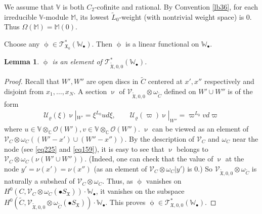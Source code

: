 \documentclass[12pt,b5paper,notitlepage]{report}
\theoremstyle{definition}
\theoremstyle{plain}
\newtheorem{lm}[df]{Lemma}
\newcommand{\fk}{\mathfrak}
\newcommand{\mc}{\mathcal}
\newcommand{\wtd}{\widetilde}
\newcommand{\scr}{\mathscr}
\newcommand{\SX}{S_{\fk X}}
\newcommand{\blt}{\bullet}
\newcommand{\Vbb}{\mathbb V}
\newcommand{\Wbb}{\mathbb W}
\newcommand{\Mbb}{\mathbb M}
\newcommand{\Cbb}{\mathbb C}
\numberwithin{equation}{section}
\begin{document}
We assume  that $\Vbb$ is both $C_2$-cofinite and rational. By Convention \ref{lb36}, for each irreducible $\Vbb$-module $\Mbb$,  its lowest $\wtd L_0$-weight (with nontrivial weight space) is $0$. Thus $\Omega(\Mbb)=\Mbb(0)$.

Choose any $\upphi\in\scr T_{\fk X_0}^*(\Wbb_\blt)$. Then $\upphi$ is a linear functional on $\Wbb_\blt$.


\begin{lm}
$\upphi$ is an element of $\scr T_{\wtd{\fk X},0,0}^*(\Wbb_\blt)$.
\end{lm}



\begin{proof}
Recall that $W',W''$ are open discs in $\wtd C$ centered at $x',x''$  respectively and disjoint from $x_1,\dots,x_N$. A section $\upnu$ of $\scr V_{\wtd{\fk X},0,0}\otimes\omega_{\wtd C}$ defined on $W'\cup W''$	is of the form
\begin{gather*}
\mc U_\varrho(\xi)\upnu|_{W'}=\xi^{L_0}ud\xi,\qquad \mc U_\varrho(\varpi)\upnu|_{W''}=\varpi^{L_0}vd\varpi
\end{gather*}
where $u\in\Vbb\otimes_\Cbb\scr O(W'),v\in\Vbb\otimes_\Cbb\scr O(W'')$.   $\upnu$ can be viewed as 	an element of $\scr V_C\otimes\omega_C((W'-x')\cup (W''-x''))$. By the description of $\scr V_C$ and $\omega_C$ near the node (see \eqref{eq225} and \eqref{eq159}), it is easy to see that $\upnu$ belongs to $\scr V_C\otimes\omega_C(\nu(W'\cup W''))$. (Indeed, one can check that the value of $\upnu$ at the node $y'=\nu(x')=\nu(x'')$ (as an element of $\scr V_C\otimes\omega_C|y'$) is $0$.) So $\scr V_{\wtd{\fk X},0,0}\otimes\omega_{\wtd C}$ is naturally a subsheaf of $\scr V_C\otimes\omega_C$. Thus, as $\upphi$ vanishes on $H^0(C,\scr V_C\otimes\omega_C(\blt\SX))\cdot \Wbb_\blt$, it vanishes on the subspace $H^0(\wtd C,\scr V_{\wtd{\fk X},0,0}\otimes\omega_{\wtd C}(\blt\SX))\cdot \Wbb_\blt$. This proves $\upphi\in\scr T_{\fk X,0,0}^*(\Wbb_\blt)$.
\end{proof}	
\end{document}
